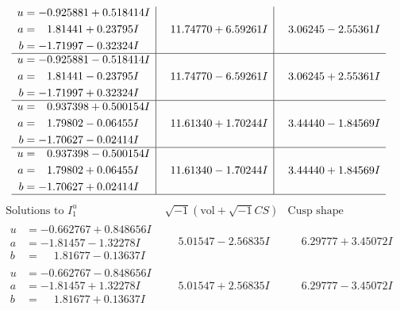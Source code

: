 \documentclass[1p]{elsarticle_modified}
\theoremstyle{definition}
\newcommand{\I}{\sqrt{-1}}
\begin{document}
$$\begin{array}{c|c|c}
\begin{aligned}
u &= -0.925881 + 0.518414 I \\
a &= \phantom{-}1.81441 + 0.23795 I \\
b &= -1.71997 - 0.32324 I\end{aligned}
 & \phantom{-}11.74770 + 6.59261 I & \phantom{-}3.06245 - 2.55361 I \\ \hline\begin{aligned}
u &= -0.925881 - 0.518414 I \\
a &= \phantom{-}1.81441 - 0.23795 I \\
b &= -1.71997 + 0.32324 I\end{aligned}
 & \phantom{-}11.74770 - 6.59261 I & \phantom{-}3.06245 + 2.55361 I \\ \hline\begin{aligned}
u &= \phantom{-}0.937398 + 0.500154 I \\
a &= \phantom{-}1.79802 - 0.06455 I \\
b &= -1.70627 - 0.02414 I\end{aligned}
 & \phantom{-}11.61340 + 1.70244 I & \phantom{-}3.44440 - 1.84569 I \\ \hline\begin{aligned}
u &= \phantom{-}0.937398 - 0.500154 I \\
a &= \phantom{-}1.79802 + 0.06455 I \\
b &= -1.70627 + 0.02414 I\end{aligned}
 & \phantom{-}11.61340 - 1.70244 I & \phantom{-}3.44440 + 1.84569 I\\
 \hline 
 \end{array}$$\newpage$$\begin{array}{c|c|c}  
\text{Solutions to }I^u_{1}& \I (\text{vol} + \sqrt{-1}CS) & \text{Cusp shape}\\
 \hline 
\begin{aligned}
u &= -0.662767 + 0.848656 I \\
a &= -1.81457 - 1.32278 I \\
b &= \phantom{-}1.81677 - 0.13637 I\end{aligned}
 & \phantom{-}5.01547 - 2.56835 I & \phantom{-}6.29777 + 3.45072 I \\ \hline\begin{aligned}
u &= -0.662767 - 0.848656 I \\
a &= -1.81457 + 1.32278 I \\
b &= \phantom{-}1.81677 + 0.13637 I\end{aligned}
 & \phantom{-}5.01547 + 2.56835 I & \phantom{-}6.29777 - 3.45072 I \\ \hline\begin{aligned}

\end{aligned}
\end{array}$$
\end{document}
